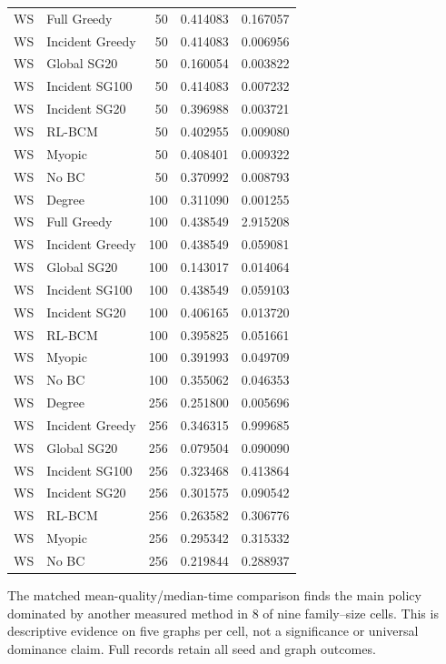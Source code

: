 \begin{longtable}{llrrr}
WS & Full Greedy & 50 & 0.414083 & 0.167057\\
WS & Incident Greedy & 50 & 0.414083 & 0.006956\\
WS & Global SG20 & 50 & 0.160054 & 0.003822\\
WS & Incident SG100 & 50 & 0.414083 & 0.007232\\
WS & Incident SG20 & 50 & 0.396988 & 0.003721\\
WS & RL-BCM & 50 & 0.402955 & 0.009080\\
WS & Myopic & 50 & 0.408401 & 0.009322\\
WS & No BC & 50 & 0.370992 & 0.008793\\
WS & Degree & 100 & 0.311090 & 0.001255\\
WS & Full Greedy & 100 & 0.438549 & 2.915208\\
WS & Incident Greedy & 100 & 0.438549 & 0.059081\\
WS & Global SG20 & 100 & 0.143017 & 0.014064\\
WS & Incident SG100 & 100 & 0.438549 & 0.059103\\
WS & Incident SG20 & 100 & 0.406165 & 0.013720\\
WS & RL-BCM & 100 & 0.395825 & 0.051661\\
WS & Myopic & 100 & 0.391993 & 0.049709\\
WS & No BC & 100 & 0.355062 & 0.046353\\
WS & Degree & 256 & 0.251800 & 0.005696\\
WS & Incident Greedy & 256 & 0.346315 & 0.999685\\
WS & Global SG20 & 256 & 0.079504 & 0.090090\\
WS & Incident SG100 & 256 & 0.323468 & 0.413864\\
WS & Incident SG20 & 256 & 0.301575 & 0.090542\\
WS & RL-BCM & 256 & 0.263582 & 0.306776\\
WS & Myopic & 256 & 0.295342 & 0.315332\\
WS & No BC & 256 & 0.219844 & 0.288937\\
\bottomrule\end{longtable}
The matched mean-quality/median-time comparison finds the main policy dominated by another measured method in 8 of nine family--size cells. This is descriptive evidence on five graphs per cell, not a significance or universal dominance claim. Full records retain all seed and graph outcomes.

